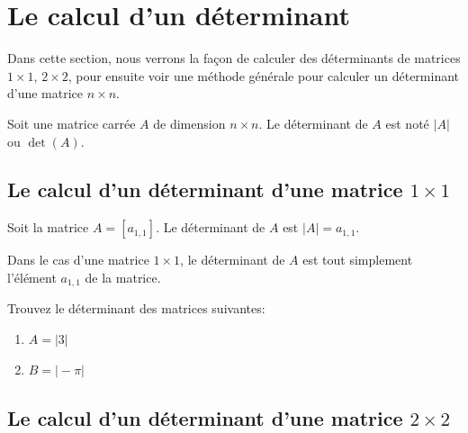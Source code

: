 \documentclass[]{book}
\providecommand{\tightlist}{%
  \setlength{\itemsep}{0pt}\setlength{\parskip}{0pt}}
\theoremstyle{definition}
\theoremstyle{definition}
\theoremstyle{definition}
\theoremstyle{remark}
\let\BeginKnitrBlock\begin \let\EndKnitrBlock\end
\begin{document}
\hypertarget{le-calcul-dun-duxe9terminant}{%
\section{Le calcul d'un déterminant}\label{le-calcul-dun-duxe9terminant}}

Dans cette section, nous verrons la façon de calculer des déterminants de matrices \(1\times 1\), \(2\times 2\), pour ensuite voir une méthode générale pour calculer un déterminant d'une matrice \(n\times n\).

\BeginKnitrBlock{definition}[Le déterminant d'une matrice]
\protect\hypertarget{def:unnamed-chunk-86}{}{\label{def:unnamed-chunk-86} {} }Soit une matrice carrée \(A\) de dimension \(n\times n\). Le déterminant de \(A\) est noté \(\vert A\vert\) ou \(\det (A)\).
\EndKnitrBlock{definition}

\hypertarget{le-calcul-dun-duxe9terminant-dune-matrice-1-times-1}{%
\subsection{\texorpdfstring{Le calcul d'un déterminant d'une matrice \(1 \times 1\)}{Le calcul d'un déterminant d'une matrice 1 \textbackslash{}times 1}}\label{le-calcul-dun-duxe9terminant-dune-matrice-1-times-1}}

\BeginKnitrBlock{definition}
\protect\hypertarget{def:unnamed-chunk-87}{}{\label{def:unnamed-chunk-87} }Soit la matrice \(A=[a_{1,1}]\). Le déterminant de \(A\) est \(\vert A\vert=a_{1,1}\).
\EndKnitrBlock{definition}

Dans le cas d'une matrice \(1\times 1\), le déterminant de \(A\) est tout simplement l'élément \(a_{1,1}\) de la matrice.

\BeginKnitrBlock{example}
\protect\hypertarget{exm:unnamed-chunk-88}{}{\label{exm:unnamed-chunk-88} }Trouvez le déterminant des matrices suivantes:

\begin{enumerate}
\def\labelenumi{\alph{enumi}.}
\tightlist
\item
  \(A=\vert 3\vert\)
\item
  \(B=\vert -\pi\vert\)
\end{enumerate}
\EndKnitrBlock{example}

\hypertarget{le-calcul-dun-duxe9terminant-dune-matrice-2times-2}{%
\subsection{\texorpdfstring{Le calcul d'un déterminant d'une matrice \(2\times 2\)}{Le calcul d'un déterminant d'une matrice 2\textbackslash{}times 2}}\label{le-calcul-dun-duxe9terminant-dune-matrice-2times-2}}
\end{document}
